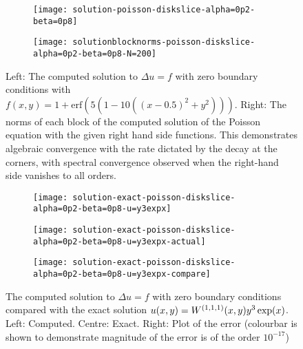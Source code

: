 \begin{figure}[t]
	\begin{subfigure}{0.3\textwidth}
		\texttt{[image: solution-poisson-diskslice-alpha=0p2-beta=0p8]}
		\centering
	\end{subfigure}
	\begin{subfigure}{0.5\textwidth}
		\centering
		\texttt{[image: solutionblocknorms-poisson-diskslice-alpha=0p2-beta=0p8-N=200]}
	\end{subfigure}
	\caption{Left: The computed solution to $\Delta u = f$ with zero boundary conditions with $f(x,y) = 1 + \text{erf}(5(1 - 10((x - 0.5)^2 + y^2)))$. Right: The norms of each block of the computed solution of the Poisson equation with the given right hand side functions. This demonstrates algebraic convergence with the rate dictated by the decay at the corners, with spectral convergence observed when the right-hand side vanishes to all orders.}
	\centering
	\label{fig:ds:poisson}
\end{figure}

\begin{figure}[t]
	\begin{subfigure}{0.3\textwidth}
	\texttt{[image: solution-exact-poisson-diskslice-alpha=0p2-beta=0p8-u=y3expx]}
	\centering
	\end{subfigure}
	\begin{subfigure}{0.3\textwidth}
	\centering
	\texttt{[image: solution-exact-poisson-diskslice-alpha=0p2-beta=0p8-u=y3expx-actual]}
	\centering
	\end{subfigure}
	\begin{subfigure}{0.3\textwidth}
	\texttt{[image: solution-exact-poisson-diskslice-alpha=0p2-beta=0p8-u=y3expx-compare]}
	\centering
	\end{subfigure}
	\centering
	\caption{The computed solution to $\Delta u = f$ with zero boundary conditions compared with the exact solution $u(x,y) = W^{(1,1,1)} (x,y) y^3 \exp(x)$. Left: Computed. Centre: Exact. Right: Plot of the error (colourbar is shown to demonstrate magnitude of the error is of the order $10^{-17}$)}
	\centering
	\label{fig:ds:poissonexact}
\end{figure}

